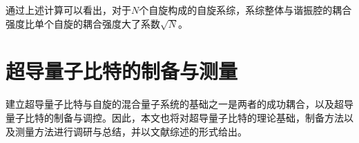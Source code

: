             
           通过上述计算可以看出，对于$N$个自旋构成的自旋系综，系综整体与谐振腔的耦合强度比单个自旋的耦合强度大了系数$\sqrt N$。
            




        \section{超导量子比特的制备与测量} %
        \label{sec:fabrication_characterization}
            
            建立超导量子比特与自旋的混合量子系统的基础之一是两者的成功耦合，以及超导量子比特的制备与调控。因此，本文也将对超导量子比特的理论基础\cite{schuster2007circuit,koch2007charge}，制备方法\cite{krantz2010investigation,kelly2015fault}以及测量方法\cite{weber2016quantum}进行调研与总结，并以文献综述的形式给出。


